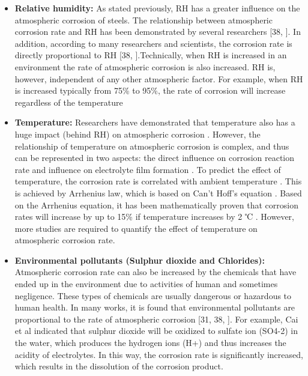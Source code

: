 \documentclass[12pt]{report}
\begin{document}
\begin{itemize}
    \item \textbf{Relative humidity:} As stated previously, RH has a greater influence on the atmospheric corrosion of steels. The relationship between atmospheric corrosion rate and RH has been demonstrated by several researchers [38, \cite{islam2018effects}]. In addition, according to many researchers and scientists, the corrosion rate is directly proportional to RH [38, \cite{islam2018effects}].Technically, when RH is increased in an environment the rate of atmospheric corrosion is also increased. RH is, however, independent of any other atmospheric factor. For example, when RH is increased typically from 75\% to 95\%, the rate of corrosion will increase regardless of the temperature \cite{sourmail2005stainless}
    
    \item \textbf{Temperature:}  Researchers have demonstrated that temperature also has a huge impact (behind RH) on atmospheric corrosion \cite{islam2018effects, cengel1998heat}. However, the relationship of temperature on atmospheric corrosion is complex, and thus can be represented in two aspects: the direct influence on corrosion reaction rate and influence on electrolyte film formation \cite{cai2018influence}. To predict the effect of temperature, the corrosion rate is correlated with ambient temperature \cite{pei2021understanding}.  This is achieved by Arrhenius law, which is based on Can't Hoff’s equation \cite{cai2018influence}. Based on the Arrhenius equation, it has been mathematically proven that corrosion rates will increase by up to 15\% if temperature increases by 2 ℃ \cite{mcarthur2004engineering}. However, more studies are required to quantify the effect of temperature on atmospheric corrosion rate.  
    
    \item \textbf{Environmental pollutants (Sulphur dioxide and Chlorides):} Atmospheric corrosion rate can also be increased by the chemicals that have ended up in the environment due to activities of human and sometimes negligence. These types of chemicals are usually dangerous or hazardous to human health. In many works, it is found that environmental pollutants are proportional to the rate of atmospheric corrosion [31, 38, \cite{islam2018effects}]. For example, Cai et al \cite{cai2018influence} indicated that sulphur dioxide will be oxidized to sulfate ion (SO4-2) in the water, which produces the hydrogen ions (H+) and thus increases the acidity of electrolytes. In this way, the corrosion rate is significantly increased, which results in the dissolution of the corrosion product.
\end{itemize}
    
\end{document}
